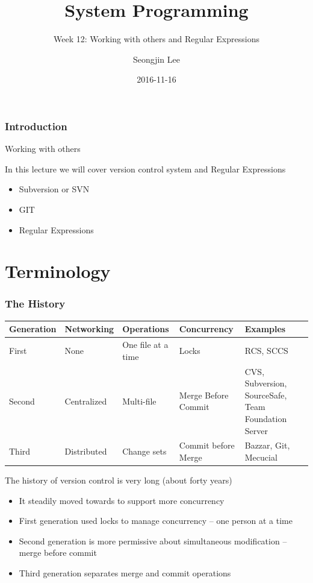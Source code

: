 \documentclass[newPxFont,sthlmFooter,nooffset]{beamer}
\title{System Programming}
\subtitle{Week 12: Working with others and Regular Expressions}
\author[SJL]{Seongjin Lee}
\institute{\href{mailto:insight@hanyang.ac.kr}{insight@hanyang.ac.kr}\\\url{http://esos.hanyang.ac.kr}\\Esos Lab. Hanyang University}
\date{2016-11-16}
\begin{document}
\frame[plain]{\titlepage} 






\begin{frame}[t]
  \frametitle{Introduction}

Working with others 

In this lecture we will cover version control system and Regular Expressions
\begin{itemize}
\item Subversion or SVN
\item GIT
\item Regular Expressions
\end{itemize}
\end{frame}

\section{Terminology}

\begin{frame}[t]
  \frametitle{The History}
{\footnotesize
  \begin{table}[h]
    \centering
    \begin{tabular}{l | l | m{2cm} | m{2cm} | m{3cm}}
      Generation & Networking & Operations & Concurrency & Examples \\ \hline \hline
First & None & One file at a time & Locks & RCS, SCCS \\ \hline
Second & Centralized & Multi-file & Merge Before Commit & CVS, Subversion, SourceSafe, Team Foundation Server \\ \hline
Third & Distributed & Change sets & Commit before Merge & Bazzar, Git, Mecucial
    \end{tabular}
  \end{table}
}

The history of version control is very long (about forty years)
\begin{itemize}
\item It steadily moved towards to support more concurrency
\item First generation used locks to manage concurrency – one person at a time
\item Second generation is more permissive about simultaneous modification – merge before commit
\item Third generation separates merge and commit operations
\end{itemize}
\end{frame}
\end{document}
